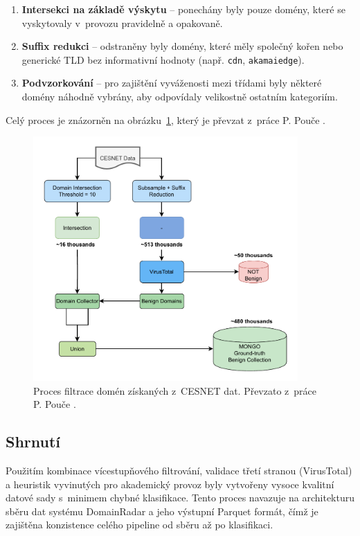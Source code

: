 \begin{enumerate}
    \item \textbf{Intersekci na základě výskytu} – ponechány byly pouze domény, které se vyskytovaly v~provozu pravidelně a opakovaně.
    \item \textbf{Suffix redukci} – odstraněny byly domény, které měly společný kořen nebo generické TLD bez informativní hodnoty (např. \texttt{cdn}, \texttt{akamaiedge}).
    \item \textbf{Podvzorkování} – pro zajištění vyváženosti mezi třídami byly některé domény náhodně vybrány, aby odpovídaly velikostně ostatním kategoriím.
\end{enumerate}

Celý proces je znázorněn na obrázku~\ref{fig:cesnet_filtering}, který je převzat z~práce P. Pouče \cite{petr}.

\begin{figure}[H]
    \centering
    \includegraphics[width=0.9\textwidth]{obrazky-figures/cesnet-filtering.pdf}
    \caption{Proces filtrace domén získaných z~CESNET dat. Převzato z~práce P. Pouče \cite{petr}.}
    \label{fig:cesnet_filtering}
\end{figure}

\subsection{Shrnutí}

Použitím kombinace vícestupňového filtrování, validace třetí stranou (VirusTotal) a heuristik vyvinutých pro akademický provoz byly vytvořeny vysoce kvalitní datové sady s~minimem chybné klasifikace. Tento proces navazuje na architekturu sběru dat systému DomainRadar a jeho výstupní Parquet formát, čímž je zajištěna konzistence celého pipeline od sběru až po klasifikaci.



